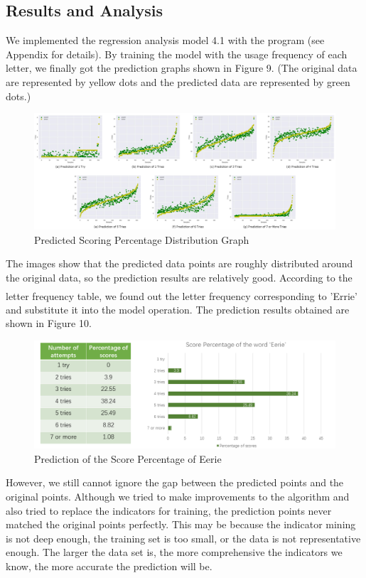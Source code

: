 \documentclass[12pt]{article}
\newcommand{\upcite}[1]{\textsuperscript{\textsuperscript{\cite{#1}}}}
\begin{document}
\subsection{Results and Analysis}

We implemented the regression analysis model 4.1 with the program (see Appendix for details).
By training the model with the usage frequency of each letter, we finally got the prediction graphs shown in Figure 9.
(The original data are represented by yellow dots and the predicted data are represented by green dots.)

\begin{figure}[H]
    \centering
    \includegraphics[scale=0.52]{2_2.png}
    \caption{Predicted Scoring Percentage Distribution Graph}
\end{figure}

The images show that the predicted data points are roughly distributed around the original data, so the prediction results are relatively good. 
According to the letter frequency table\upcite{3}, we found out the letter frequency corresponding to 'Errie' and substitute it into the model operation. The prediction results obtained are shown in Figure 10.

\begin{figure}[H]
    \centering
    \includegraphics[scale=0.52]{2_3.png}
    \caption{Prediction of the Score Percentage of Eerie  }
\end{figure}

However, we still cannot ignore the gap between the predicted points and the original points. Although we tried to make improvements to the algorithm and also tried to replace the indicators for training, the prediction points never matched the original points perfectly. This may be because the indicator mining is not deep enough, the training set is too small, or the data is not representative enough. The larger the data set is, the more comprehensive the indicators we know, the more accurate the prediction will be.
\end{document}

